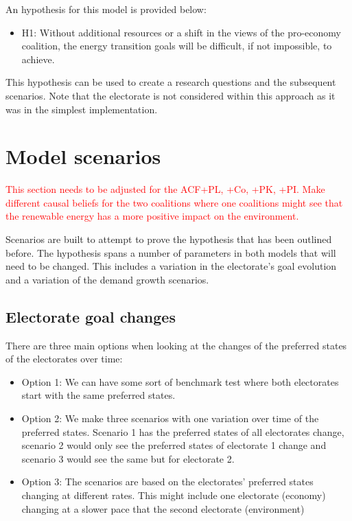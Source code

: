 \documentclass[12pt]{article}
\begin{document}
An hypothesis for this model is provided below:

\begin{itemize}
\item H1: Without additional resources or a shift in the views of the pro-economy coalition, the energy transition goals will be difficult, if not impossible, to achieve.
\end{itemize}

This hypothesis can be used to create a research questions and the subsequent scenarios. Note that the electorate is not considered within this approach as it was in the simplest implementation.

\section{Model scenarios}
\label{sec:steps}

\textcolor{red}{This section needs to be adjusted for the ACF+PL, +Co, +PK, +PI. Make different causal beliefs for the two coalitions where one coalitions might see that the renewable energy has a more positive impact on the environment.}

Scenarios are built to attempt to prove the hypothesis that has been outlined before. The hypothesis spans a number of parameters in both models that will need to be changed. This includes a variation in the electorate's goal evolution and a variation of the demand growth scenarios.

\subsection{Electorate goal changes}

There are three main options when looking at the changes of the preferred states of the electorates over time:

\begin{itemize}
\item Option 1: We can have some sort of benchmark test where both electorates start with the same preferred states.
\item Option 2: We make three scenarios with one variation over time of the preferred states. Scenario 1 has the preferred states of all electorates change, scenario 2 would only see the preferred states of electorate 1 change and scenario 3 would see the same but for electorate 2.
\item Option 3: The scenarios are based on the electorates' preferred states changing at different rates. This might include one electorate (economy) changing at a slower pace that the second electorate (environment)
\end{itemize}
\end{document}
